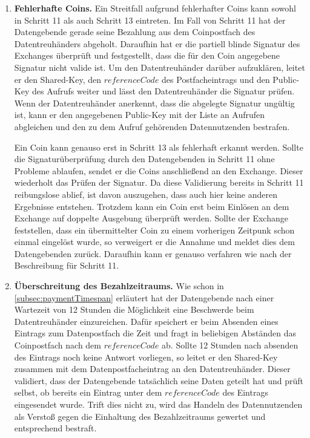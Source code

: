 \documentclass{scrreprt}
\begin{document}
\begin{enumerate}
    \item \textbf{Fehlerhafte Coins.}\label{case:IncorrectCoins}
    Ein Streitfall aufgrund fehlerhafter Coins kann sowohl in Schritt 11 als auch Schritt 13 eintreten. Im Fall von Schritt 11 hat der Datengebende gerade seine Bezahlung aus dem Coinpostfach des Datentreuhänders abgeholt. Daraufhin hat er die partiell blinde Signatur des Exchanges überprüft und festgestellt, dass die für den Coin angegebene Signatur nicht valide ist. Um den Datentreuhänder darüber aufzuklären, leitet er den Shared-Key, den $referenceCode$ des Postfacheintrags und den Public-Key des Aufrufs weiter und lässt den Datentreuhänder die Signatur prüfen. Wenn der Datentreuhänder anerkennt, dass die abgelegte Signatur ungültig ist, kann er den angegebenen Public-Key mit der Liste an Aufrufen abgleichen und den zu dem Aufruf gehörenden Datennutzenden bestrafen.
    
    Ein Coin kann genauso erst in Schritt 13 als fehlerhaft erkannt werden. Sollte die Signaturüberprüfung durch den Datengebenden in Schritt 11 ohne Probleme ablaufen, sendet er die Coins anschließend an den Exchange. Dieser wiederholt das Prüfen der Signatur. Da diese Validierung bereits in Schritt 11 reibungslose ablief, ist davon auszugehen, dass auch hier keine anderen Ergebnisse entstehen. Trotzdem kann ein Coin erst beim Einlösen an dem Exchange auf doppelte Ausgebung überprüft werden. Sollte der Exchange feststellen, dass ein übermittelter Coin zu einem vorherigen Zeitpunk schon einmal eingelöst wurde, so verweigert er die Annahme und meldet dies dem Datengebenden zurück. Daraufhin kann er genauso verfahren wie nach der Beschreibung für Schritt 11.

    \item \textbf{Überschreitung des Bezahlzeitraums.} \label{case:paymentExceeded}
    Wie schon in \ref{subsec:paymentTimespan} erläutert hat der Datengebende nach einer Wartezeit von 12 Stunden die Möglichkeit eine Beschwerde beim Datentreuhänder einzureichen. Dafür speichert er beim Absenden eines Eintrags zum Datenpostfach die Zeit und fragt in beliebigen Abständen das Coinpostfach nach dem $referenceCode$ ab. Sollte 12 Stunden nach absenden des Eintrags noch keine Antwort vorliegen, so leitet er den Shared-Key zusammen mit dem Datenpostfacheintrag an den Datentreuhänder. Dieser validiert, dass der Datengebende tatsächlich seine Daten geteilt hat und prüft selbst, ob bereits ein Eintrag unter dem $referenceCode$ des Eintrags eingesendet wurde. Trift dies nicht zu, wird das Handeln des Datennutzenden als Verstoß gegen die Einhaltung des Bezahlzeitraums gewertet und entsprechend bestraft.
\end{enumerate}
\end{document}

